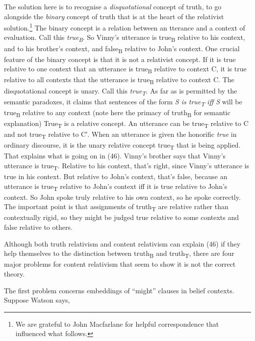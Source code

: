 \documentclass[
  11pt,
  letterpaper,
  DIV=11,
  numbers=noendperiod,
  twoside]{scrartcl}
\begin{document}
The solution here is to recognise a \emph{disquotational} concept of
truth, to go alongside the \emph{binary} concept of truth that is at the
heart of the relativist solution.\footnote{We are grateful to John
  Macfarlane for helpful correspondence that influenced what follows.}
The binary concept is a relation between an tterance and a context of
evaluation. Call this \emph{true\textsubscript{B}}. So Vinny's utterance
is true\textsubscript{B} relative to his context, and to his brother's
context, and false\textsubscript{B} relative to John's context. One
crucial feature of the binary concept is that it is not a relativist
concept. If it is true relative to one context that an utterance is
true\textsubscript{B} relative to context C, it is true relative to all
contexts that the utterance is true\textsubscript{B} relative to context
C. The disquotational concept is unary. Call this
\emph{true\textsubscript{T}}. As far as is permitted by the semantic
paradoxes, it claims that sentences of the form \emph{S is
true\textsubscript{T}} \emph{iff S} will be true\textsubscript{B}
relative to any context (note here the primacy of truth\textsubscript{B}
for semantic explanation) True\textsubscript{T} is a relative concept.
An utterance can be true\textsubscript{T} relative to C and not
true\textsubscript{T} relative to C′. When an utterance is given the
honorific \emph{true} in ordinary discourse, it is the unary relative
concept true\textsubscript{T} that is being applied. That explains what
is going on in (46). Vinny's brother says that Vinny's utterance is
true\textsubscript{T}. Relative to his context, that's right, since
Vinny's utterance is true in his context. But relative to John's
context, that's false, because an utterance is true\textsubscript{T}
relative to John's context iff it is true relative to John's context. So
John spoke truly relative to his own context, so he spoke correctly. The
important point is that assignments of truth\textsubscript{T} are
relative rather than contextually rigid, so they might be judged true
relative to some contexts and false relative to others.

Although both truth relativism and content relativism can explain (46)
if they help themselves to the distinction between
truth\textsubscript{B} and truth\textsubscript{T}, there are four major
problems for content relativism that seem to show it is not the correct
theory.

The first problem concerns embeddings of ``might'' clauses in belief
contexts. Suppose Watson says,
\end{document}
